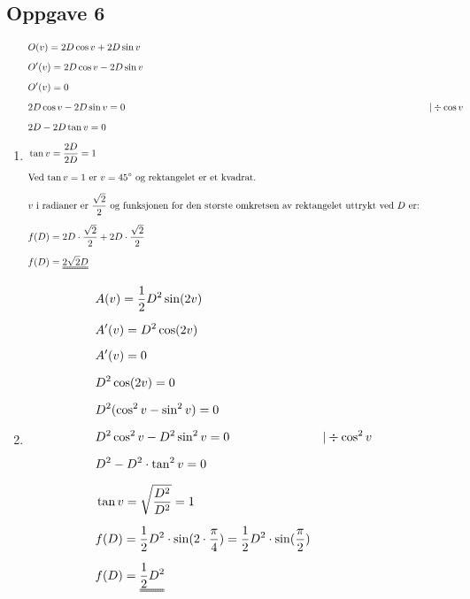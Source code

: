 \documentclass[11pt,a4paper]{report}
\newcommand{\opgd}[1]{\item[#1)]}
\newcommand{\opg}[1]{\subsection*{Oppgave #1}}
\begin{document}
\newpage
\opg{6}
\begin{enumerate}[leftmargin=*,itemsep=0.75cm,labelsep=1.5em,label=\alph*)]
\opgd{c}
\begin{align*}
&O(v) = 2D \cos v + 2D \sin v\\[0.2cm]
&O'(v) = 2D \cos v - 2D \sin v\\[0.2cm]
&O'(v) = 0\\[0.2cm]
&2D \cos v - 2D \sin v = 0 &&| \div \cos v\\[0.2cm]
&2D - 2D \tan v = 0\\[0.2cm]
&\tan v = \frac{2D}{2D} = 1\\[0.2cm]
&\text{Ved $\tan v = 1$ er $v = 45 \degree$ og rektangelet er et kvadrat.}\\[0.2cm]
&\text{$v$ i radianer er $\frac{\sqrt{2}}{2}$ og funksjonen for den største omkretsen av rektangelet uttrykt ved $D$ er:}\\[0.2cm]
&f(D) = 2D \cdot \frac{\sqrt{2}}{2} + 2D \cdot \frac{\sqrt{2}}{2} \\[0.2cm]
&f(D) = \uuline{2 \sqrt{2} D}
&\\
\end{align*}
\opgd{d}
\begin{align*}
&A(v) = \frac{1}{2} D^2 \sin(2v)\\[0.2cm]
&A'(v) = D^2 \cos(2v)\\[0.2cm]
&A'(v) = 0\\[0.2cm]
&D^2 \cos(2v) = 0\\[0.2cm]
&D^2 (\cos^2 v - \sin^2 v) = 0\\[0.2cm]
&D^2 \cos^2 v - D^2 \sin^2 v = 0 &&| \div \cos^2 v\\[0.2cm]
&D^2 - D^2 \cdot \tan^2 v = 0\\[0.2cm]
&\tan v = \sqrt{\frac{D^2}{D^2}} = 1\\[0.2cm]
&f(D) = \frac{1}{2} D^2 \cdot \sin(2 \cdot \frac{\pi}{4}) = \frac{1}{2} D^2 \cdot \sin(\frac{\pi}{2})\\[0.2cm]
&f(D) = \uuline{\frac{1}{2}D^2}
\end{align*}
\end{enumerate}

\end{document}
